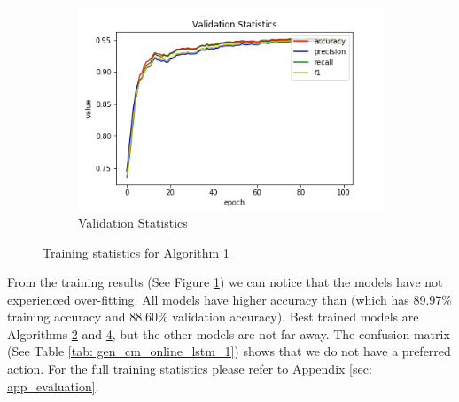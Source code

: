 \begin{figure}[h!]
\begin{subfigure}[b]{0.35\linewidth}
    \includegraphics[width=\linewidth]{images/trained_online_lstm/tile_by_tile_training_uniform_random_fill_10000_model_validation_stats.png}
     \caption{Validation Statistics}
  \end{subfigure}
  \caption{Training statistics for Algorithm \hyperref[tab: evalalgorithms]{1}}
  \label{fig: gen_train_olnine_lstm_1}
\end{figure}

\FloatBarrier

From the training results (See Figure \ref{fig: gen_train_olnine_lstm_1}) we can notice that the models have not experienced over-fitting. All models have higher accuracy than \cite{nicola2018lstm} (which has 89.97\% training accuracy and 88.60\% validation accuracy). Best trained models are Algorithms \hyperref[tab: evalalgorithms]{2} and \hyperref[tab: evalalgorithms]{4}, but the other models are not far away. The confusion matrix (See Table \ref{tab: gen_cm_online_lstm_1}) shows that we do not have a preferred action. For the full training statistics please refer to Appendix \ref{sec: app_evaluation}.

